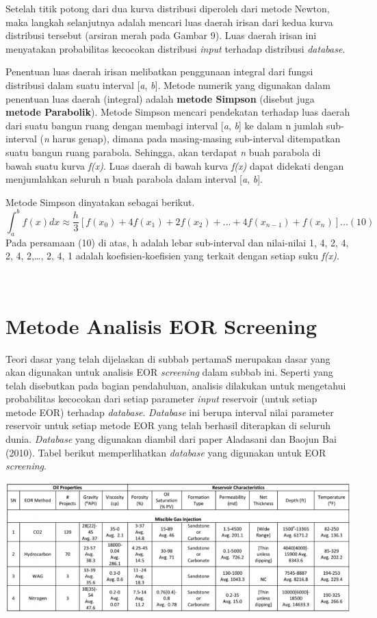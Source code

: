 \documentclass[
]{book}
\begin{document}
Setelah titik potong dari dua kurva distribusi diperoleh dari metode Newton, maka langkah selanjutnya adalah mencari luas daerah irisan dari kedua kurva distribusi tersebut (arsiran merah pada Gambar 9). Luas daerah irisan ini menyatakan probabilitas kecocokan distribusi \emph{input} terhadap distribusi \emph{database}.

Penentuan luas daerah irisan melibatkan penggunaan integral dari fungsi distribusi dalam suatu interval {[}\emph{a}, \emph{b}{]}. Metode numerik yang digunakan dalam penentuan luas daerah (integral) adalah \textbf{metode Simpson} (disebut juga \textbf{metode Parabolik}). Metode Simpson mencari pendekatan terhadap luas daerah dari suatu bangun ruang dengan membagi interval {[}\emph{a}, \emph{b}{]} ke dalam n jumlah sub-interval (\emph{n} harus genap), dimana pada masing-masing sub-interval ditempatkan suatu bangun ruang parabola. Sehingga, akan terdapat \emph{n} buah parabola di bawah suatu kurva \emph{f(x)}. Luas daerah di bawah kurva \emph{f(x)} dapat didekati dengan menjumlahkan seluruh n buah parabola dalam interval {[}\emph{a}, \emph{b}{]}.

Metode Simpson dinyatakan sebagai berikut.
\[\int_a^bf(x)dx \approx \frac{h}{3}[f(x_0)+4f(x_1)+2f(x_2)+...+4f(x_{n-1})+f(x_n)]...(10)\]
Pada persamaan (10) di atas, h adalah lebar sub-interval dan nilai-nilai 1, 4, 2, 4, 2, 4, 2,\ldots, 2, 4, 1 adalah koefisien-koefisien yang terkait dengan setiap suku \emph{f(x)}.

~

\hypertarget{metode-analisis-eor-screening}{%
\section{Metode Analisis EOR Screening}\label{metode-analisis-eor-screening}}

Teori dasar yang telah dijelaskan di subbab pertamaS merupakan dasar yang akan digunakan untuk analisis EOR \emph{screening} dalam subbab ini. Seperti yang telah disebutkan pada bagian pendahuluan, analisis dilakukan untuk mengetahui probabilitas kecocokan dari setiap parameter \emph{input} reservoir (untuk setiap metode EOR) terhadap \emph{database}. \emph{Database} ini berupa interval nilai parameter reservoir untuk setiap metode EOR yang telah berhasil diterapkan di seluruh dunia. \emph{Database} yang digunakan diambil dari paper Aladasani dan Baojun Bai (2010). Tabel berikut memperlihatkan \emph{database} yang digunakan untuk EOR \emph{screening}.

\begin{center}\includegraphics[width=1\linewidth]{images/screening/miscible} \end{center}
\end{document}
